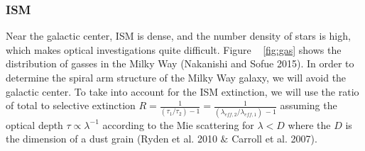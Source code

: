 \documentclass[letterpaper,11pt]{article}
\begin{document}

\subsubsection{ISM}

Near the galactic center, ISM is dense, and the number density of stars is high, which makes optical investigations quite difficult. Figure ~ \ref{fig:gas} shows the distribution of gasses in the Milky Way (Nakanishi and Sofue 2015). In order to determine the spiral arm structure of the Milky Way galaxy, we will avoid the galactic center. To take into account for the ISM extinction, we will use the ratio of total to selective extinction $R = \frac{1}{(\tau_{1} / \tau_{2}) -1} = \frac{1}{(\lambda_{eff,2} / \lambda_{eff,1}) \, -1}$ assuming the optical depth $\tau \propto \lambda^{-1}$ according to the Mie scattering for $\lambda < D$ where the $D$ is the dimension of a dust grain (Ryden et al. 2010 $\&$ Carroll et al. 2007). 
\end{document}
